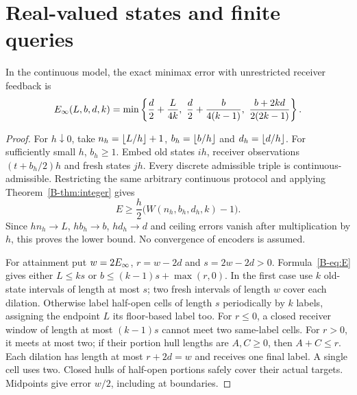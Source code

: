 \section{Real-valued states and finite queries}
\begin{theorem}\label{B-thm:continuous}
In the continuous model, the exact minimax error with unrestricted receiver feedback is
\begin{equation}\label{B-eq:E}
E_{\infty}(L,b,d,k)=\min\left\{\frac d2+\frac{L}{4k},\ \frac d2+\frac{b}{4(k-1)},\ \frac{b+2kd}{2(2k-1)}\right\}.
\end{equation}
\end{theorem}
\begin{proof}
For $h\downarrow0$, take $n_h=\left\lfloor L/h\right\rfloor+1$, $b_h=\left\lfloor b/h\right\rfloor$ and $d_h=\left\lfloor d/h\right\rfloor$. For sufficiently small $h$, $b_h\geq1$. Embed old states $ih$, receiver observations $(t+b_h/2)h$ and fresh states $jh$. Every discrete admissible triple is continuous-admissible. Restricting the same arbitrary continuous protocol and applying Theorem~\ref{B-thm:integer} gives
\begin{equation}\label{B-eq:grid}
E\geq\frac h2\bigl(W(n_h,b_h,d_h,k)-1\bigr).
\end{equation}
Since $hn_h\to L$, $hb_h\to b$, $hd_h\to d$ and ceiling errors vanish after multiplication by $h$, this proves the lower bound. No convergence of encoders is assumed.

For attainment put $w=2E_{\infty}$, $r=w-2d$ and $s=2w-2d>0$. Formula~\eqref{B-eq:E} gives either $L\leq ks$ or $b\leq(k-1)s+\max(r,0)$. In the first case use $k$ old-state intervals of length at most $s$; two fresh intervals of length $w$ cover each dilation. Otherwise label half-open cells of length $s$ periodically by $k$ labels, assigning the endpoint $L$ its floor-based label too. For $r\leq0$, a closed receiver window of length at most $(k-1)s$ cannot meet two same-label cells. For $r>0$, it meets at most two; if their portion hull lengths are $A,C\geq0$, then $A+C\leq r$. Each dilation has length at most $r+2d=w$ and receives one final label. A single cell uses two. Closed hulls of half-open portions safely cover their actual targets. Midpoints give error $w/2$, including at boundaries.
\end{proof}

